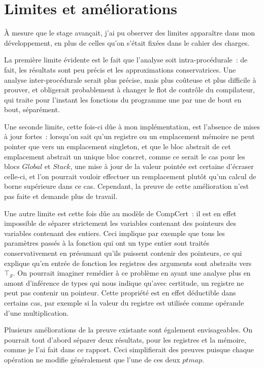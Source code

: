 \documentclass{article}
\newcommand\tS{\mathcal{S}}
\begin{document}
\newpage
\section{Limites et améliorations}

À mesure que le stage avançait, j'ai pu observer des limites apparaître dans
mon développement, en plus de celles qu'on s'était fixées dans le cahier des
charges.

La première limite évidente est le fait que l'analyse soit intra-procédurale~:
de fait, les résultats sont peu précis et les approximations conservatrices.
Une analyse inter-procédurale serait plus précise, mais plus coûteuse et plus
difficile à prouver, et obligerait probablement à changer le flot de contrôle
du compilateur, qui traite pour l'instant les fonctions du programme une par
une de bout en bout, séparément.

Une seconde limite, cette fois-ci dûe à mon implémentation, est l'absence de
mises à jour fortes~: lorsqu'on sait qu'un registre ou un emplacement mémoire
ne peut pointer que vers un emplacement singleton, et que le bloc abstrait de
cet emplacement abstrait un unique bloc concret, comme ce serait le cas pour
les blocs $Global$ et $Stack$, une mise à jour de la valeur
pointée est certaine d'écraser celle-ci, et l'on pourrait vouloir effectuer un
remplacement plutôt qu'un calcul de borne supérieure dans ce cas.  Cependant,
la preuve de cette amélioration n'est pas faite et demande plus de travail.

Une autre limite est cette fois dûe au modèle de CompCert~: il est en effet
impossible de séparer strictement les variables contenant des pointeurs des
variables contenant des entiers. Ceci implique par exemple que tous les
paramètres passés à la fonction qui ont un type entier sont traités
conservativement en présumant qu'ils puissent contenir des pointeurs, ce qui
explique qu'en entrée de fonction les registres des arguments sont abstraits
vers $\top_\tS$. On pourrait imaginer remédier à ce problème en ayant une
analyse plus en amont d'inférence de types qui nous indique qu'avec certitude,
un registre ne peut pas contenir un pointeur. Cette propriété est en effet
déductible dans certains cas, par exemple si la valeur du registre est utilisée
comme opérande d'une multiplication.

Plusieurs améliorations de la preuve existante sont également envisageables. On
pourrait tout d'abord séparer deux résultats, pour les registres et la mémoire,
comme je l'ai fait dans ce rapport. Ceci simplifierait des preuves puisque
chaque opération ne modifie généralement que l'une de ces deux
$ptmap$.
\end{document}
